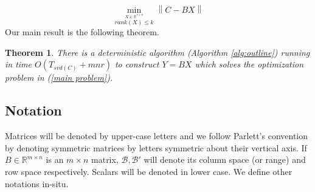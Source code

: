 \documentclass[11pt]{article}
\newtheorem{theorem}{Theorem}
\renewcommand{\math}[1]{$#1$}
\def\reals{\mathbb{R}}
\newcommand{\norm}[1]{\left\|#1\right\|}
\newcommand{\B}{\mathcal{B}}
\begin{document}
\begin{equation}\label{main problem}
\min_{\stackrel{X \in  \reals^{r \times n}}{rank({X}) \leq k}} \norm{{C} - {BX}}
\end{equation}
Our main result is the following theorem.
\begin{theorem}\label{thm:main}
There is a deterministic algorithm (Algorithm \ref{alg:outline})
 running in time
\math{O(T_{svd(C)}+mnr)} to construct \math{Y=BX} which solves the optimization
problem in (\ref{main problem}).
\end{theorem}
\subsection{Notation}
Matrices will be denoted by upper-case letters and we follow Parlett's convention by denoting symmetric matrices by letters symmetric about their vertical axis. If $B \in \reals^{m \times n}$ is an $m \times n$ matrix, $\B, \B'$ will denote its column space (or range) and row space respectively. Scalars will be denoted in lower case. We define other notations in-situ. 
\end{document}
